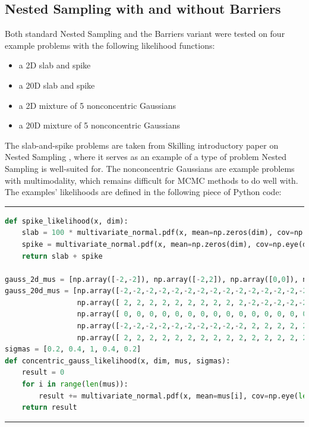 \documentclass[12pt, a4paper]{report}
\begin{document}
\subsection{Nested Sampling with and without Barriers}
Both standard Nested Sampling and the Barriers variant were tested on four example problems with the following likelihood functions:
\begin{itemize}
    \item a 2D slab and spike
    \item a 20D slab and spike
    \item a 2D mixture of 5 nonconcentric Gaussians
    \item a 20D mixture of 5 nonconcentric Gaussians 
\end{itemize}
The slab-and-spike problems are taken from Skilling introductory paper on Nested Sampling \cite{skilling}, where it serves as an example of a type of problem Nested Sampling is well-suited for.
The nonconcentric Gaussians are example problems with multimodality, which remains difficult for MCMC methods to do well with.
The examples' likelihoods are defined in the following piece of Python code:
\vspace{0.4cm}

\hrule
\begin{lstlisting}[language=Python]
def spike_likelihood(x, dim):
    slab = 100 * multivariate_normal.pdf(x, mean=np.zeros(dim), cov=np.eye(dim)*0.01)
    spike = multivariate_normal.pdf(x, mean=np.zeros(dim), cov=np.eye(dim)*0.1)
    return slab + spike

gauss_2d_mus = [np.array([-2,-2]), np.array([-2,2]), np.array([0,0]), np.array([2,-2]), np.array([2, 2])]
gauss_20d_mus = [np.array([-2,-2,-2,-2,-2,-2,-2,-2,-2,-2,-2,-2,-2,-2,-2,-2,-2,-2,-2,-2]),
                 np.array([ 2, 2, 2, 2, 2, 2, 2, 2, 2, 2,-2,-2,-2,-2,-2,-2,-2,-2,-2,-2]),
                 np.array([ 0, 0, 0, 0, 0, 0, 0, 0, 0, 0, 0, 0, 0, 0, 0, 0, 0, 0, 0, 0]),
                 np.array([-2,-2,-2,-2,-2,-2,-2,-2,-2,-2, 2, 2, 2, 2, 2, 2, 2, 2, 2, 2]),
                 np.array([ 2, 2, 2, 2, 2, 2, 2, 2, 2, 2, 2, 2, 2, 2, 2, 2, 2, 2, 2, 2])]
sigmas = [0.2, 0.4, 1, 0.4, 0.2]
def concentric_gauss_likelihood(x, dim, mus, sigmas):
    result = 0
    for i in range(len(mus)):
        result += multivariate_normal.pdf(x, mean=mus[i], cov=np.eye(len(mus[i]))*sigmas[i])
    return result
\end{lstlisting}
\hrule
\end{document}
